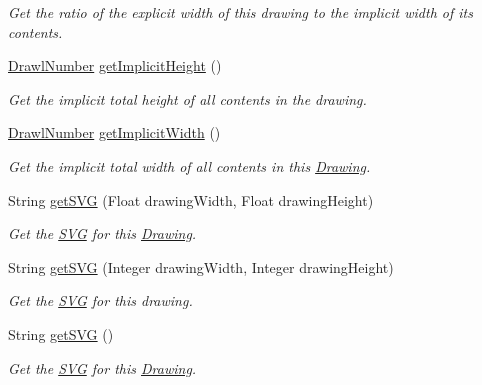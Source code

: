 \begin{DoxyCompactItemize}
\begin{DoxyCompactList}\small\item\em Get the ratio of the explicit width of this drawing to the implicit width of its contents. \end{DoxyCompactList}\item 
\hyperlink{classcom_1_1aarrelaakso_1_1drawl_1_1_drawl_number}{Drawl\+Number} \hyperlink{classcom_1_1aarrelaakso_1_1drawl_1_1_drawing_ae45ca0e4dbfe162f10995bc307b098ec}{get\+Implicit\+Height} ()
\begin{DoxyCompactList}\small\item\em Get the implicit total height of all contents in the drawing. \end{DoxyCompactList}\item 
\hyperlink{classcom_1_1aarrelaakso_1_1drawl_1_1_drawl_number}{Drawl\+Number} \hyperlink{classcom_1_1aarrelaakso_1_1drawl_1_1_drawing_a833e9f69bd01b9640e34286ab53c0c90}{get\+Implicit\+Width} ()
\begin{DoxyCompactList}\small\item\em Get the implicit total width of all contents in this \hyperlink{classcom_1_1aarrelaakso_1_1drawl_1_1_drawing}{Drawing}. \end{DoxyCompactList}\item 
String \hyperlink{classcom_1_1aarrelaakso_1_1drawl_1_1_drawing_a7977c75a7448a5f93082e30753ce23c3}{get\+S\+VG} (Float drawing\+Width, Float drawing\+Height)
\begin{DoxyCompactList}\small\item\em Get the \hyperlink{classcom_1_1aarrelaakso_1_1drawl_1_1_s_v_g}{S\+VG} for this \hyperlink{classcom_1_1aarrelaakso_1_1drawl_1_1_drawing}{Drawing}. \end{DoxyCompactList}\item 
String \hyperlink{classcom_1_1aarrelaakso_1_1drawl_1_1_drawing_af9e3b649e8088e4ba3c6377f3eddf452}{get\+S\+VG} (Integer drawing\+Width, Integer drawing\+Height)
\begin{DoxyCompactList}\small\item\em Get the \hyperlink{classcom_1_1aarrelaakso_1_1drawl_1_1_s_v_g}{S\+VG} for this drawing. \end{DoxyCompactList}\item 
String \hyperlink{classcom_1_1aarrelaakso_1_1drawl_1_1_drawing_ae49bfdabbf7177b244a7a0b5ae995fe1}{get\+S\+VG} ()
\begin{DoxyCompactList}\small\item\em Get the \hyperlink{classcom_1_1aarrelaakso_1_1drawl_1_1_s_v_g}{S\+VG} for this \hyperlink{classcom_1_1aarrelaakso_1_1drawl_1_1_drawing}{Drawing}. \end{DoxyCompactList}\item 

\end{DoxyCompactItemize}
